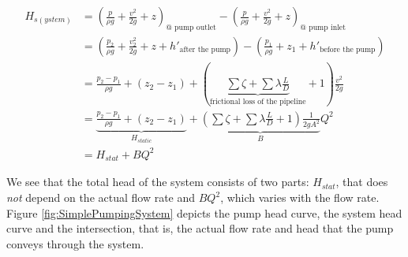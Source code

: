 \begin{align}
H_{s(ystem)}&=
\left( \frac{p}{\rho g}+\frac{v^2}{2g}+z\right)_{\text{@ pump outlet}}-
\left( \frac{p}{\rho g}+\frac{v^2}{2g}+z\right)_{\text{@ pump inlet}}\nonumber\\
&=\left(\frac{p_2}{\rho g}+\frac{v_2^2}{2g}+z+h'_{\text{after the pump}}\right)-
\left(\frac{p_1}{\rho g}+z_1+h'_{\text{before the pump}}\right)\nonumber\\
&=\frac{p_2-p_1}{\rho g}+\left(z_2-z_1\right)
+\left(\underbrace{\sum\zeta+\sum\lambda\frac{L}{D}}_{\text{frictional loss of the pipeline}}+1\right)\frac{v^2}{2g}\nonumber\\
&=\underbrace{\frac{p_2-p_1}{\rho g}+\left(z_2-z_1\right)}_{H_{static}}
+\underbrace{\left(\sum\zeta+\sum\lambda\frac{L}{D}+1\right)\frac{1}{2gA^2}}_{B}Q^2\nonumber\\
&=H_{stat}+BQ^2
\end{align}

We see that the total head of the system consists of two parts: $H_{stat}$, that does \emph{not} depend on the actual flow rate and $BQ^2$, which varies with the flow rate. Figure \ref{fig:SimplePumpingSystem} depicts the pump head curve, the system head curve and the intersection, that is, the actual flow rate and head that the pump conveys through the system. 





\clearpage
